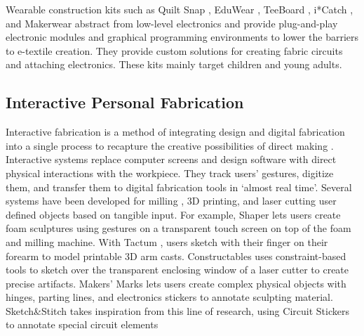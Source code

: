 Wearable construction kits such as Quilt Snap \cite{buechley2005quilt}, EduWear \cite{katterfeldt2009eduwear}, TeeBoard \cite{ngai2009teeboard}, i*Catch \cite{ngai2010catch}, and Makerwear \cite{kazemitabaar2017makerwear} abstract from low-level electronics and provide plug-and-play electronic modules and graphical programming environments to lower the barriers to e-textile creation. They provide custom solutions for creating fabric circuits and attaching electronics. These kits mainly target children and young adults.










\subsection{Interactive Personal Fabrication}
Interactive fabrication is a method of integrating design and digital fabrication into a single process to recapture the creative possibilities of direct making \cite{willis2011interactive}. Interactive systems replace computer screens and design software with direct physical interactions with the workpiece. They track users' gestures, digitize them, and transfer them to digital fabrication tools in `almost real time'. Several systems have been developed for milling \cite{Li:2017:DID:3083157.3096344}, 3D printing, and laser cutting user defined objects based on tangible input. For example, Shaper \cite{willis2011interactive} lets users create foam sculptures using gestures on a transparent touch screen on top of the foam and milling machine. %
With Tactum \cite{gannon2015tactum}, users sketch with their finger on their forearm to model printable 3D arm casts. Constructables \cite{mueller2012interactive} uses constraint-based tools to sketch over the transparent enclosing window of a laser cutter to create precise artifacts. Makers' Marks \cite{savage2015makers} lets users create complex physical objects with hinges, parting lines, and electronics stickers to annotate sculpting material.
Sketch\&Stitch takes inspiration from this line of research, using Circuit Stickers to annotate special circuit elements %


